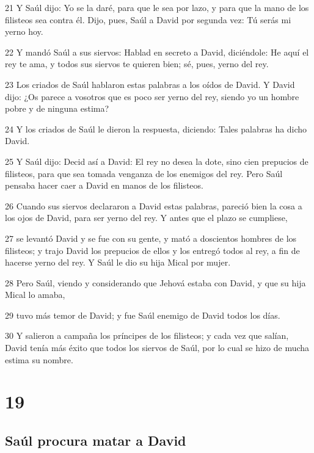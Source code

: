 \par 21 Y Saúl dijo: Yo se la daré, para que le sea por lazo, y para que la mano de los filisteos sea contra él. Dijo, pues, Saúl a David por segunda vez: Tú serás mi yerno hoy.
\par 22 Y mandó Saúl a sus siervos: Hablad en secreto a David, diciéndole: He aquí el rey te ama, y todos sus siervos te quieren bien; sé, pues, yerno del rey.
\par 23 Los criados de Saúl hablaron estas palabras a los oídos de David. Y David dijo: ¿Os parece a vosotros que es poco ser yerno del rey, siendo yo un hombre pobre y de ninguna estima?
\par 24 Y los criados de Saúl le dieron la respuesta, diciendo: Tales palabras ha dicho David.
\par 25 Y Saúl dijo: Decid así a David: El rey no desea la dote, sino cien prepucios de filisteos, para que sea tomada venganza de los enemigos del rey. Pero Saúl pensaba hacer caer a David en manos de los filisteos.
\par 26 Cuando sus siervos declararon a David estas palabras, pareció bien la cosa a los ojos de David, para ser yerno del rey. Y antes que el plazo se cumpliese,
\par 27 se levantó David y se fue con su gente, y mató a doscientos hombres de los filisteos; y trajo David los prepucios de ellos y los entregó todos al rey, a fin de hacerse yerno del rey. Y Saúl le dio su hija Mical por mujer.
\par 28 Pero Saúl, viendo y considerando que Jehová estaba con David, y que su hija Mical lo amaba,
\par 29 tuvo más temor de David; y fue Saúl enemigo de David todos los días.
\par 30 Y salieron a campaña los príncipes de los filisteos; y cada vez que salían, David tenía más éxito que todos los siervos de Saúl, por lo cual se hizo de mucha estima su nombre.

\chapter{19}

\section*{Saúl procura matar a David}

